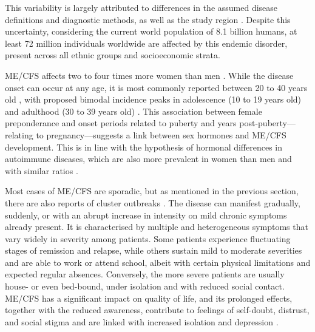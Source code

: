 This variability is largely attributed to differences in the assumed disease definitions and diagnostic methods, as well as the study region \citep{vincent2012PrevalenceIncidence, nacul2011PrevalenceMyalgic, valdez2018EstimatingPrevalence, slomko2019PrevalenceCharacteristics}. Despite this uncertainty, considering the current world population of 8.1 billion humans, at least 72 million individuals worldwide are affected by this endemic disorder, present across all ethnic groups and socioeconomic strata.

ME/CFS affects two to four times more women than men \citep{castro-marrero2017ComorbidityChronic, lim2020ReviewCase}. While the disease onset can occur at any age, it is most commonly reported between 20 to 40 years old \citep{valdez2018EstimatingPrevalence}, with proposed bimodal incidence peaks in adolescence (10 to 19 years old) and adulthood (30 to 39 years old) \citep{bakken2014TwoAge}. This association between female preponderance and onset periods related to puberty and years post-puberty---relating to pregnancy---suggests a link between sex hormones and ME/CFS development. This is in line with the hypothesis of hormonal differences in autoimmune diseases, which are also more prevalent in women than men and with similar ratios \citep{whitacre2001SexDifferences, quintero2012AutoimmuneDisease}.

Most cases of ME/CFS are sporadic, but as mentioned in the previous section, there are also reports of cluster outbreaks \citep{themedicalstaffoftheroyalfreehospital1957OutbreakEncephalomyelitis}. The disease can manifest gradually, suddenly, or with an abrupt increase in intensity on mild chronic symptoms already present. It is characterised by multiple and heterogeneous symptoms that vary widely in severity among patients. Some patients experience fluctuating stages of remission and relapse, while others sustain mild to moderate severities and are able to work or attend school, albeit with certain physical limitations and expected regular absences. Conversely, the more severe patients are usually house- or even bed-bound, under isolation and with reduced social contact. ME/CFS has a significant impact on quality of life, and its prolonged effects, together with the reduced awareness, contribute to feelings of self-doubt, distrust, and social stigma and are linked with increased isolation and depression \citep{instituteofmedicine2015MyalgicEncephalomyelitis, lacerda2019HopeDisappointment}.


